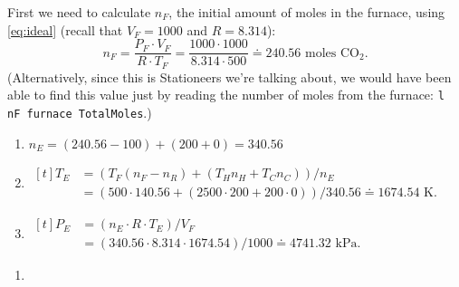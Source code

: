 \documentclass{article}
\newcommand{\CDiox}{\mathrm{CO}_2}
\begin{document}
\begin{example*}
    First we need to calculate $n_F$, the initial amount of moles in the furnace, using
    \cref{eq:ideal} (recall that $V_F=1000$ and $R=8.314$):
    \[
        n_F
        = \frac{P_F\cdot V_F}{R\cdot T_F}
        = \frac{1000\cdot 1000}{8.314\cdot 500}
        \doteq 240.56 \text{ moles $\CDiox$}.
    \]
    (Alternatively, since this is Stationeers we're talking about, we would have been able to
    find this value just by reading the number of moles from the furnace:
    \texttt{l nF furnace TotalMoles}.)
    \begin{example*}[$n_R=100$, $n_H=200$ and $n_C=0$]
        \phantom{ }
        \begin{enumerate}[label=(\alph*)]
            \item
                \begin{math}
                    n_E=(240.56-100)+(200+0)=340.56
                \end{math}
            \item
                \begin{math}
                    \begin{aligned}[t]
                        T_E
                        &= (T_F(n_F-n_R)+(T_H n_H+T_C n_C))/n_E \\
                        &= (500\cdot 140.56+(2500\cdot 200+200\cdot 0))/340.56
                        \doteq 1674.54\text{ K}.
                    \end{aligned}
                \end{math}
            \item
                \begin{math}
                    \begin{aligned}[t]
                        P_E
                        &= (n_E\cdot R\cdot T_E)/V_F \\
                        &= (340.56\cdot 8.314\cdot 1674.54)/1000
                        \doteq 4741.32\text{ kPa}.
                    \end{aligned}
                \end{math}
        \end{enumerate}
    \end{example*}
    \begin{example*}[$n_R=0$, $n_H=0$, and $n_C=300$]
        \phantom{ }
        \begin{enumerate}[label=(\alph*)]
            \item
                \begin{math}

\end{math}
\end{enumerate}
\end{example*}
\end{example*}
\end{document}
